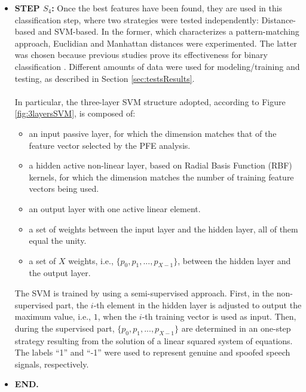 \begin{itemize}
			\item{}\textbf{STEP $S_4$: }Once the best features have been found, they are used in this classification step, where two strategies were tested independently: Distance-based and SVM-based. In the former, which characterizes a pattern-matching approach, Euclidian and Manhattan distances were experimented. The latter was chosen because previous studies prove its effectiveness for binary classification \cite{bennett2000support}. Different amounts of data were used for modeling/training and testing, as described in Section \ref{sec:testsResults}.
			\\
			\\
			In particular, the three-layer SVM structure adopted, according to Figure \ref{fig:3layersSVM}, is composed of:
			\begin{itemize}
				\item{}an input passive layer, for which the dimension matches that of the feature vector selected by the PFE analysis.
				\item{}a hidden active non-linear layer, based on Radial Basis Function (RBF) kernels, for which the dimension matches the number of training feature vectors being used. 
				\item{}an output layer with one active linear element. 
				\item{}a set of weights between the input layer and the hidden layer, all of them equal the unity. 
				\item{}a set of $X$ weights, i.e., $\{p_0, p_1, ..., p_{X-1}\}$, between the hidden layer and the output layer.
			\end{itemize}
			The SVM is trained by using a semi-supervised approach. First, in the non-supervised part, the $i$-th element in the hidden layer is adjusted to output the maximum value, i.e., $1$, when the $i$-th training vector is used as input. Then, during the supervised part, $\{p_0, p_1, ..., p_{X-1}\}$ are determined in an one-step strategy resulting from the solution of a linear squared system of equations\cite{poole2014linear}. The labels ``1'' and ``-1'' were used to represent genuine and spoofed speech signals, respectively.  
			\item{}\textbf{END.}
		\end{itemize}
		
		
